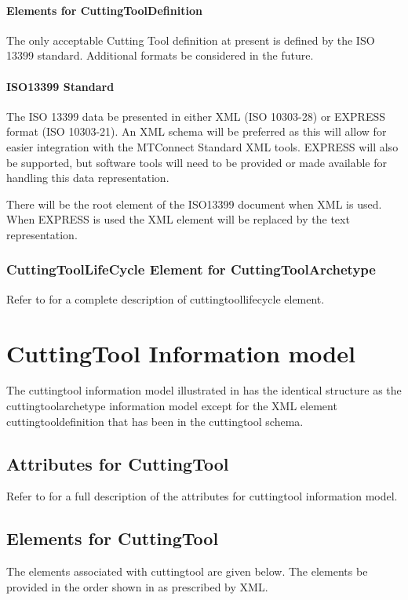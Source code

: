 \documentclass{mtconnect}	%
\begin{document}
\paragraph{Elements for CuttingToolDefinition}\mbox{}

The only acceptable Cutting Tool definition at present is defined by the ISO 13399 standard.  Additional formats \MAY be considered in the future.

\paragraph{ISO13399 Standard}\mbox{}

The ISO 13399 data \MUST be presented in either XML (ISO 10303-28) or EXPRESS format (ISO 10303-21).  An XML schema will be preferred as this will allow for easier integration with the MTConnect Standard XML tools.  EXPRESS will also be supported, but software tools will need to be provided or made available for handling this data representation.

There will be the root element of the ISO13399 document when XML is used.  When EXPRESS is used the XML element will be replaced by the text representation.


\subsubsection{CuttingToolLifeCycle Element for CuttingToolArchetype}
Refer to  for a complete description of \gls{cuttingtoollifecycle} element.


\section{CuttingTool Information model}
The \gls{cuttingtool} \gls{information model} illustrated in  has the identical structure as the \gls{cuttingtoolarchetype} \gls{information model} except for the XML element \gls{cuttingtooldefinition} that has been \DEPRECATED in the \gls{cuttingtool} schema.

\subsection{Attributes for CuttingTool}
Refer to  for a full description of the attributes for \gls{cuttingtool} \gls{information model}.

\subsection{Elements for CuttingTool}
The elements associated with \gls{cuttingtool} are given below.    The elements \MUST be provided in the order shown in  as prescribed by XML.
\end{document}
